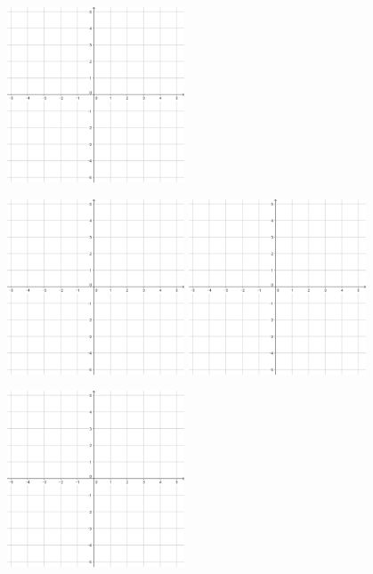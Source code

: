 \documentclass[a4paper]{oblivoir}
\begin{document}
\begin{figure}
\hspace{30pt}\includegraphics[width=0.47\textwidth]{55}
\end{figure}

\clearpage
\begin{figure}
\noindent\includegraphics[width=0.47\textwidth]{55}
\hspace{30pt}\includegraphics[width=0.47\textwidth]{55}
\par\vspace{40pt}
\noindent\includegraphics[width=0.47\textwidth]{55}

\end{figure}
\end{document}

